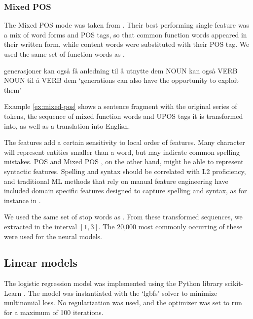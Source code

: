 \subsubsection*{Mixed POS}

The Mixed POS mode was taken from \textcite{malmasi15}. Their best performing
single feature was a mix of word forms and POS tags, so that common function
words appeared in their written form, while content words were substituted
with their POS tag. We used the same set of function words as
\citeauthor{malmasi15}.

\begin{example}
\gll generasjoner kan også få   anledning til å utnytte dem  
     NOUN         kan også VERB NOUN      til å VERB    dem  
\glt `generations can also have the opportunity to exploit them'
\glend
\label{ex:mixed-pos}
\end{example}

Example \ref{ex:mixed-pos} shows a sentence fragment with the original series
of tokens, the sequence of mixed function words and UPOS tags it is
transformed into, as well as a translation into English.

The \ngram features add a certain sensitivity to local order of features.
Many character \ngrams will represent entities smaller than a word, but may
indicate common spelling mistakes. \ac{POS} and Mixed POS \ngrams, on the
other hand, might be able to represent syntactic features. Spelling and
syntax should be correlated with L2 proficiency, and traditional \ac{ML}
methods that rely on manual feature engineering have included domain specific
features designed to capture spelling and syntax, as for instance in
\textcite{vajjala17}.

We used the same set of stop words as \citeauthor{malmasi15}. From these
transformed sequences, we extracted \ngrams in the interval $[1,3]$. The
20,000 most commonly occurring of these were used for the neural models.


\subsection{Linear models}
\label{subsec:linear}

The logistic regression model was implemented using the Python library
scikit-Learn \autocite{scikit-learn}. The model was instantiated with the
`lgbfs' solver to minimize multinomial loss. No regularization was used, and
the optimizer was set to run for a maximum of 100 iterations.

